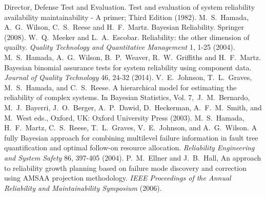 \documentclass[12pt]{article}
\begin{document}
\begin{thebibliography}{99}
 Director, Defense Test and Evaluation. Test and evaluation of system reliability availability maintainability - A primer; Third Edition (1982).
 M.\ S.\ Hamada, A.\ G.\ Wilson, C.\ S.\ Reese and H.\ F.\ Martz. Bayesian Reliability. Springer (2008).
 W.\ Q.\ Meeker and L.\ A.\ Escobar. Reliability: the other dimension of quailty. \textit{Quality Technology and Quantitative Management} 1, 1-25 (2004).
 M.\ S.\ Hamada, A.\ G.\ Wilson, B.\ P.\ Weaver, R.\ W.\ Griffiths and H.\ F.\ Martz. Bayesian binomial assurance tests for system reliability using component data. \textit{Journal of Quality Technology} 46, 24-32 (2014).
 V.\ E.\ Johnson, T.\ L.\ Graves, M.\ S.\ Hamada, and C.\ S.\ Reese. A hierarchical model for estimating the reliability of complex systems. In Bayesian Statistics, Vol. 7,\ J.\ M.\ Bernardo, M.\ J.\ Bayerri, J.\ O.\ Berger, A.\ P.\ Dawid, D.\ Heckerman, A.\ F.\ M.\ Smith, and M.\ West eds., Oxford, UK: Oxford University Press (2003).
 M.\ S.\ Hamada, H.\ F.\ Martz, C.\ S.\ Reese, T.\ L.\ Graves, V.\ E.\ Johnson, and A.\ G.\ Wilson. A fully Bayesian approach
for combining multilevel failure information in fault tree quantification and optimal follow-on resource allocation. \textit{Reliability Engineering and System Safety} 86, 397-405 (2004).
 P.\ M.\ Ellner and J.\ B.\ Hall, An approach to reliability growth planning based on failure mode discovery and correction using AMSAA projection methodology. \textit{IEEE Proceedings of the Annual Reliability and Maintainability Symposium} (2006).
\end{thebibliography}
\end{document}
